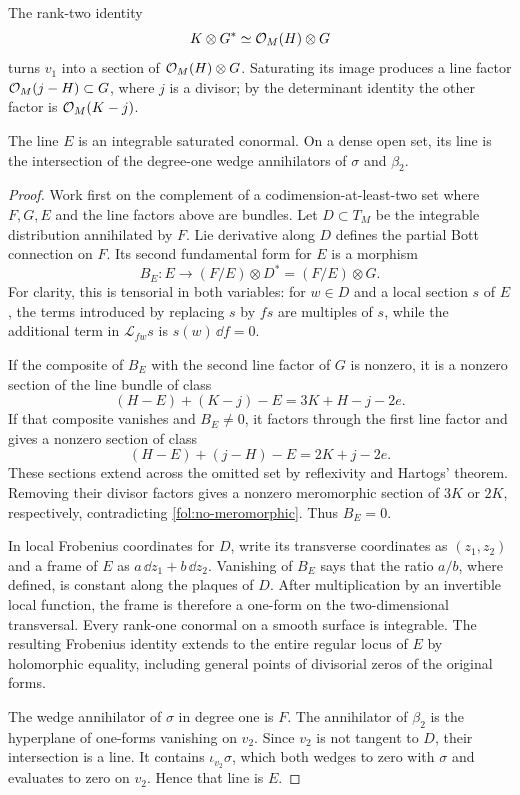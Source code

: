 The rank-two identity
\[
 K\otimes G^*\simeq\mathcal{O}_M(H)\otimes G
\]
turns $v_1$ into a section of $\mathcal{O}_M(H)\otimes G$.  Saturating its image
produces a line factor $\mathcal{O}_M(j-H)\subset G$, where $j$ is a divisor;
by the determinant identity the other factor is $\mathcal{O}_M(K-j)$.

\begin{lemma}\label{fol:Bott-integrability}
The line $E$ is an integrable saturated conormal.  On a dense open set,
its line is the intersection of the degree-one wedge annihilators of
$\sigma$ and $\beta_2$.
\end{lemma}

\begin{proof}
Work first on the complement of a codimension-at-least-two set where
$F,G,E$ and the line factors above are bundles.  Let $D\subset T_M$ be
the integrable distribution annihilated by $F$.  Lie derivative along
$D$ defines the partial Bott connection on $F$.  Its second fundamental
form for $E$ is a morphism
\begin{equation}\label{fol:Bott-tensor}
 B_E\colon E\longrightarrow(F/E)\otimes D^*
                 =(F/E)\otimes G.
\end{equation}
For clarity, this is tensorial in both variables: for $w\in D$ and a
local section $s$ of $E$, the terms introduced by replacing $s$ by $fs$
are multiples of $s$, while the additional term in $\mathcal L_{fw}s$
is $s(w)\,\dd f=0$.

If the composite of $B_E$ with the second line factor of $G$ is nonzero,
it is a nonzero section of the line bundle of class
\[
 (H-E)+(K-j)-E=3K+H-j-2e.
\]
If that composite vanishes and $B_E\ne0$, it factors through the first
line factor and gives a nonzero section of class
\[
 (H-E)+(j-H)-E=2K+j-2e.
\]
These sections extend across the omitted set by reflexivity and Hartogs'
theorem.  Removing their divisor factors gives a nonzero meromorphic
section of $3K$ or $2K$, respectively, contradicting
\eqref{fol:no-meromorphic}.  Thus $B_E=0$.

In local Frobenius coordinates for $D$, write its transverse coordinates
as $(z_1,z_2)$ and a frame of $E$ as $a\,\dd z_1+b\,\dd z_2$.
Vanishing of $B_E$ says that the ratio $a/b$, where defined, is constant
along the plaques of $D$.  After multiplication by an invertible local
function, the frame is therefore a one-form on the two-dimensional
transversal.  Every rank-one conormal on a smooth surface is integrable.
The resulting Frobenius identity extends to the entire regular locus
of $E$ by holomorphic equality, including general points of divisorial
zeros of the original forms.

The wedge annihilator of $\sigma$ in degree one is $F$.  The annihilator
of $\beta_2$ is the hyperplane of one-forms vanishing on $v_2$.  Since
$v_2$ is not tangent to $D$, their intersection is a line.  It contains
$\iota_{v_2}\sigma$, which both wedges to zero with $\sigma$ and
evaluates to zero on $v_2$.  Hence that line is $E$.
\end{proof}

